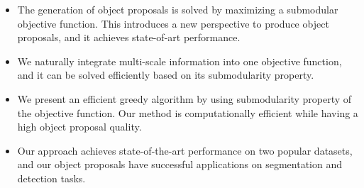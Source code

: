 \documentclass[10pt,twocolumn,letterpaper]{article}
\begin{document}
\begin{itemize}
\item The generation of object proposals is solved by maximizing a submodular objective function. This introduces a new perspective to produce object proposals, and it achieves state-of-art performance.
\item We naturally integrate multi-scale information into one objective function, and it can be solved efficiently based on its submodularity property. 
\item We present an efficient greedy algorithm by using submodularity property of the objective function. Our method is computationally efficient while having a high object proposal quality.
\item Our approach achieves state-of-the-art performance on two popular datasets, and our object proposals have successful applications on segmentation and detection tasks.
\end{itemize}


\end{document}
